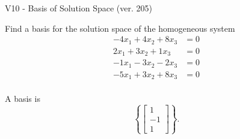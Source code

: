 \begin{exercise}
  \begin{exerciseTitle}V10 - Basis of Solution Space (ver. 205)\end{exerciseTitle}
  \begin{exerciseStatement}
    Find a basis for the solution space of the homogeneous system 
\begin{align*}
 -4 x_ 1 + 4 x_ 2 + 8 x_ 3 &= 0  \\ 
  2 x_ 1 + 3 x_ 2 + 1 x_ 3 &= 0  \\ 
  -1 x_ 1 -3 x_ 2 -2 x_ 3 &= 0  \\ 
  -5 x_ 1 + 3 x_ 2 + 8 x_ 3 &= 0  \\ 
 \end{align*}


 
  \end{exerciseStatement}

  \begin{exerciseAnswer}
   A basis is   
\[\left\{\left[\begin{array}{c}
1 \\
-1 \\
1
\end{array}\right]\right\}.\]

  


  \end{exerciseAnswer}
\end{exercise}